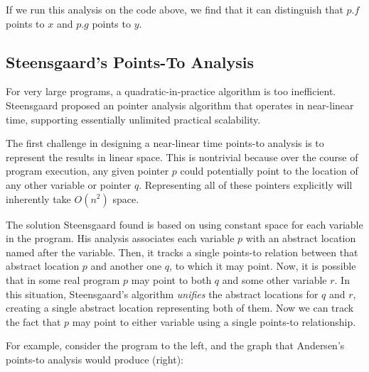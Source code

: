 \documentclass[11pt]{article}
\begin{document}
If we run this analysis on the code above, we find that it can distinguish that
$p.f$ points to $x$ and $p.g$ points to $y$.


\subsection{Steensgaard's Points-To Analysis}

For very large programs, a quadratic-in-practice algorithm is too inefficient.
Steensgaard proposed an pointer analysis algorithm that operates in near-linear
time, supporting essentially unlimited practical scalability.

The first challenge in designing a near-linear time points-to analysis is to
represent the results in linear space. This is nontrivial because over the
course of program execution, any given pointer $p$ could potentially point to
the location of any other variable or pointer $q$. Representing all of these
pointers explicitly will inherently take $O(n^2)$ space.

The solution Steensgaard found is based on using constant space for each
variable in the program. His analysis associates each variable $p$ with an
abstract location named after the variable. Then, it tracks a single points-to
relation between that abstract location $p$ and another one $q$, to which it may
point. Now, it is possible that in some real program $p$ may point to both $q$
and some other variable $r$. In this situation, Steensgaard's algorithm
\textit{unifies} the abstract locations for $q$ and $r$, creating a single
abstract location representing both of them. Now we can track the fact that $p$
may point to either variable using a single points-to relationship.

For example, consider the program to the left, and the graph that Andersen's points-to analysis would produce (right):
\end{document}
